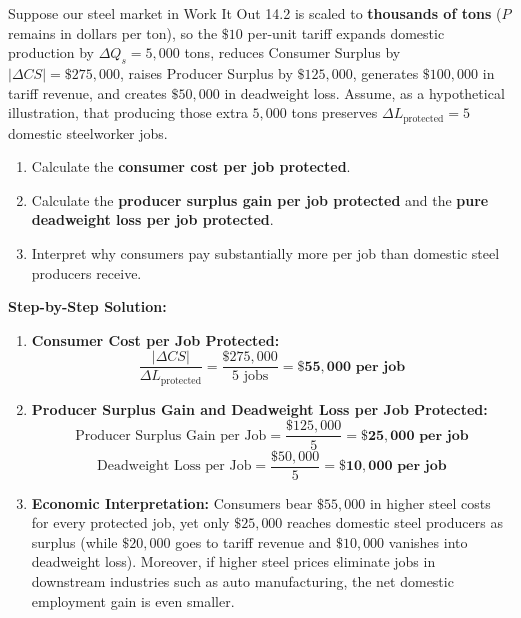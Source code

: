 \documentclass[11pt,letterpaper]{article}
\begin{document}
\begin{tcolorbox}[colback=LightSlate,colframe=CourseBlue,title=\textbf{Work It Out 14.3: Calculating Consumer Cost per Job Protected}]
Suppose our steel market in Work It Out 14.2 is scaled to \textbf{thousands of tons} ($P$ remains in dollars per ton), so the $\$10$ per-unit tariff expands domestic production by $\Delta Q_s = 5{,}000$ tons, reduces Consumer Surplus by $|\Delta CS| = \$275{,}000$, raises Producer Surplus by $\$125{,}000$, generates $\$100{,}000$ in tariff revenue, and creates $\$50{,}000$ in deadweight loss. Assume, as a hypothetical illustration, that producing those extra $5{,}000$ tons preserves $\Delta L_{\text{protected}} = 5$ domestic steelworker jobs.
\begin{enumerate}
    \item Calculate the \textbf{consumer cost per job protected}.
    \item Calculate the \textbf{producer surplus gain per job protected} and the \textbf{pure deadweight loss per job protected}.
    \item Interpret why consumers pay substantially more per job than domestic steel producers receive.
\end{enumerate}

\medskip
\noindent\textbf{Step-by-Step Solution:}
\begin{enumerate}
    \item \textbf{Consumer Cost per Job Protected:}
    \[
    \frac{|\Delta CS|}{\Delta L_{\text{protected}}} = \frac{\$275{,}000}{5\text{ jobs}} = \mathbf{\$55{,}000\text{ per job}}
    \]

    \item \textbf{Producer Surplus Gain and Deadweight Loss per Job Protected:}
    \[
    \text{Producer Surplus Gain per Job} = \frac{\$125{,}000}{5} = \mathbf{\$25{,}000\text{ per job}}
    \]
    \[
    \text{Deadweight Loss per Job} = \frac{\$50{,}000}{5} = \mathbf{\$10{,}000\text{ per job}}
    \]

    \item \textbf{Economic Interpretation:}
    Consumers bear $\$55{,}000$ in higher steel costs for every protected job, yet only $\$25{,}000$ reaches domestic steel producers as surplus (while $\$20{,}000$ goes to tariff revenue and $\$10{,}000$ vanishes into deadweight loss). Moreover, if higher steel prices eliminate jobs in downstream industries such as auto manufacturing, the net domestic employment gain is even smaller.
\end{enumerate}
\end{tcolorbox}
\end{document}

